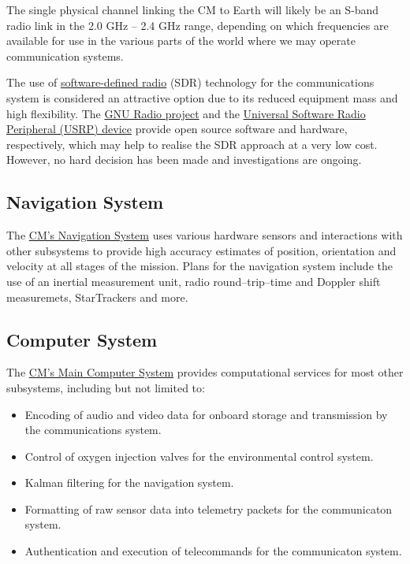 \documentclass{report}
\begin{document}
The single physical channel linking the CM to Earth will likely be an S-band radio link in the 2.0 GHz -- 2.4 GHz range, depending on which frequencies are available for use in the various parts of the world where we may operate communication systems.

The use of \href{http://en.wikipedia.org/wiki/Software_defined_radio}{software-defined radio} (SDR) technology for the communications system is considered an attractive option due to its reduced equipment mass and high flexibility.  The \href{http://gnuradio.org/redmine/wiki/gnuradio}{GNU Radio project} and the \href{http://www.ettus.com/products}{Universal Software Radio Peripheral (USRP) device} provide open source software and hardware, respectively, which may help to realise the SDR approach at a very low cost.  However, no hard decision has been made and investigations are ongoing.

\subsection{Navigation System}

The \href{http://cstart.org/wiki/CLLARE_CM_Navigation_System}{CM's Navigation System} uses various hardware sensors and interactions with other subsystems to provide high accuracy estimates of position, orientation and velocity at all stages of the mission.  Plans for the navigation system include the use of an inertial measurement unit, radio round--trip--time and Doppler shift measuremets, StarTrackers and more.

\subsection{Computer System}

The \href{http://cstart.org/wiki/CLLARE_Main_Computer_System}{CM's Main Computer System} provides computational services for most other subsystems, including but not limited to:
\begin{itemize}
\item Encoding of audio and video data for onboard storage and transmission by the communications system.
\item Control of oxygen injection valves for the environmental control system.
\item Kalman filtering for the navigation system.
\item Formatting of raw sensor data into telemetry packets for the communicaton system.
\item Authentication and execution of telecommands for the communicaton system.
\end{itemize}
\end{document}
